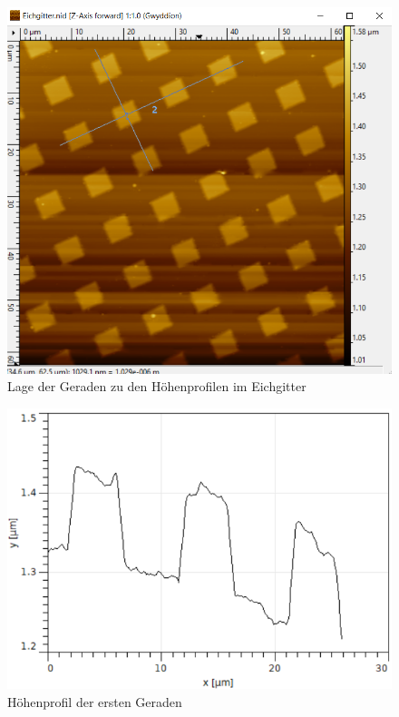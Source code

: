 \begin{figure}[h]
    \centering
    \includegraphics[scale = 0.5]{Bilder/zUebersicht.png}
    \caption{Lage der Geraden zu den Höhenprofilen im Eichgitter}
    \label{bild:zUebersicht}
\end{figure}

\begin{figure}[h]
    \centering
    \includegraphics[scale = 0.5]{Bilder/zReihe1.png}
    \caption{Höhenprofil der ersten Geraden}
    \label{bild:zReihe1}
\end{figure}

